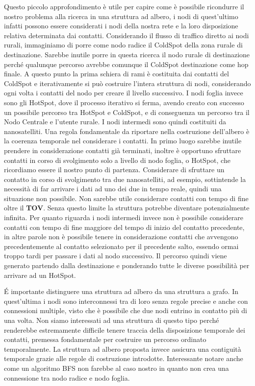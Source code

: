\documentclass[12pt,a4paper,oneside]{book}
\begin{document}
		Questo piccolo approfondimento è utile per capire come è possibile ricondurre il nostro problema alla ricerca in una struttura ad albero, i nodi di quest'ultimo infatti possono essere considerati i nodi della nostra rete e la loro disposizione relativa determinata dai contatti. Considerando il flusso di traffico diretto ai nodi rurali, immaginiamo di porre come nodo radice il ColdSpot della zona rurale di destinazione. Sarebbe inutile porre in questa ricerca il nodo rurale di destinazione perché qualunque percorso avrebbe comunque il ColdSpot destinazione come hop finale. A questo punto la prima schiera di rami è costituita dai contatti del ColdSpot e iterativamente si può costruire l'intera struttura di nodi, considerando ogni volta i contatti del nodo per creare il livello successivo. I nodi foglia invece sono gli HotSpot, dove il processo iterativo si ferma, avendo creato con successo un possibile percorso tra HotSpot e ColdSpot, e di conseguenza un percorso tra il Nodo Centrale e l'utente rurale. I nodi intermedi sono quindi costituiti da nanosatelliti. Una regola fondamentale da riportare nella costruzione dell'albero è la coerenza temporale nel considerare i contatti. In primo luogo sarebbe inutile prendere in considerazione contatti già terminati, inoltre è opportuno sfruttare contatti in corso di svolgimento solo a livello di nodo foglia, o HotSpot, che ricordiamo essere il nostro punto di partenza. Considerare di sfruttare un contatto in corso di svolgimento tra due nanosatelliti, ad esempio, sottintende la necessità di far arrivare i dati ad uno dei due in tempo reale, quindi una situazione non possibile. Non sarebbe utile considerare contatti con tempo di fine oltre il {\bf TOV}. Senza questo limite la struttura potrebbe diventare potenzialmente infinita. Per quanto riguarda i nodi intermedi invece non è possibile considerare contatti con tempo di fine maggiore del tempo di inizio del contatto precedente, in altre parole non è possibile tenere in considerazione contatti che avvengono precedentemente al contatto selezionato per il precedente salto, essendo ormai troppo tardi per passare i dati al nodo successivo. Il percorso quindi viene generato partendo dalla destinazione e ponderando tutte le diverse possibilità per arrivare ad un HotSpot.
		
		\'E importante distinguere una struttura ad albero da una struttura a grafo. In quest'ultima i nodi sono interconnessi tra di loro senza regole precise e anche con connessioni multiple, visto che è possibile che due nodi entrino in contatto più di una volta. Non siamo interessati ad una struttura di questo tipo perché renderebbe estremamente difficile tenere traccia della disposizione temporale dei contatti, premessa fondamentale per costruire un percorso ordinato temporalmente. La struttura ad albero proposta invece assicura una contiguità temporale grazie alle regole di costruzione introdotte. Interessante notare anche come un algoritmo BFS non farebbe al caso nostro in quanto non crea una connessione tra nodo radice e nodo foglia.
		
\end{document}
